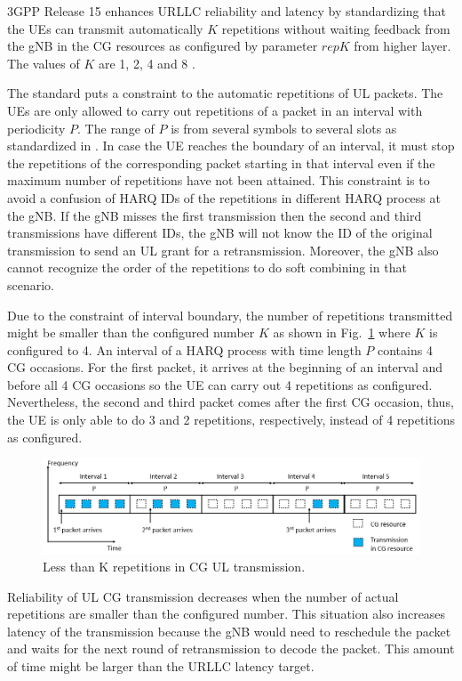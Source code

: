 \documentclass{ieeeaccess}
\begin{document}
3GPP Release 15 enhances URLLC reliability and latency by standardizing that the UEs can transmit automatically $K$ repetitions without waiting feedback from the gNB in the CG resources as configured by parameter $repK$ from higher layer. The values of $K$ are 1, 2, 4 and 8 \cite{ref6}.

The standard puts a constraint to the automatic repetitions of UL packets. The UEs are only allowed to carry out repetitions of a packet in an interval with periodicity $P$. The range of $P$ is from several symbols to several slots as standardized in \cite{ref6}. In case the UE reaches the boundary of an interval, it must stop the repetitions of the corresponding packet starting in that interval even if the maximum number of repetitions have not been attained. This constraint is to avoid a confusion of HARQ IDs of the repetitions in different HARQ process at the gNB. If the gNB misses the first transmission then the second and third transmissions have different IDs, the gNB will not know the ID of the original transmission to send an UL grant for a retransmission. Moreover, the gNB also cannot recognize the order of the repetitions to do soft combining in that scenario. 

Due to the constraint of interval boundary, the number of repetitions transmitted might be smaller than the configured number $K$ as shown in Fig.~\ref{fig4} where $K$ is configured to 4. An interval of a HARQ process with time length $P$ contains 4 CG occasions. For the first packet, it arrives at the beginning of an interval and before all 4 CG occasions so the UE can carry out 4 repetitions as configured. Nevertheless, the second and third packet comes after the first CG occasion, thus, the UE is only able to do 3 and 2 repetitions, respectively, instead of 4 repetitions as configured. 

\begin{figure}[htbp]
\centerline{\includegraphics[scale=0.33]{fig4.PNG}}
\caption{Less than K repetitions in CG UL transmission.}
\label{fig4}
\vspace{-3mm}
\end{figure}

Reliability of UL CG transmission decreases when the number of actual repetitions are smaller than the configured number. This situation also increases latency of the transmission because the gNB would need to reschedule the packet and waits for the next round of retransmission to decode the packet. This amount of time might be larger than the URLLC latency target.
\end{document}
